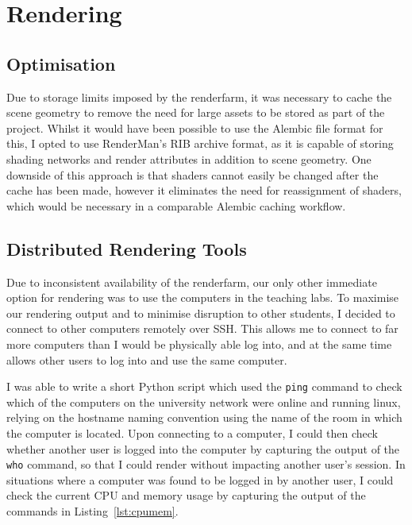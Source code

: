 \documentclass[11pt]{article}
\begin{document}

\section{Rendering}


\subsection{Optimisation}

Due to storage limits imposed by the renderfarm, it was necessary to cache the scene geometry to remove the need for large assets to be stored as part of the project. Whilst it would have been possible to use the Alembic file format for this, I opted to use RenderMan's RIB archive format, as it is capable of storing shading networks and render attributes in addition to scene geometry. One downside of this approach is that shaders cannot easily be changed after the cache has been made, however it eliminates the need for reassignment of shaders, which would be necessary in a comparable Alembic caching workflow.

\subsection{Distributed Rendering Tools}

Due to inconsistent availability of the renderfarm, our only other immediate option for rendering was to use the computers in the teaching labs. To maximise our rendering output and to minimise disruption to other students, I decided to connect to other computers remotely over SSH. This allows me to connect to far more computers than I would be physically able log into, and at the same time allows other users to log into and use the same computer.

I was able to write a short Python script which used the \texttt{ping} command to check which of the computers on the university network were online and running linux, relying on the hostname naming convention using the name of the room in which the computer is located. Upon connecting to a computer, I could then check whether another user is logged into the computer by capturing the output of the \texttt{who} command, so that I could render without impacting another user's session. In situations where a computer was found to be logged in by another user, I could check the current CPU and memory usage by capturing the output of the commands in Listing~\ref{lst:cpumem}.
\end{document}
